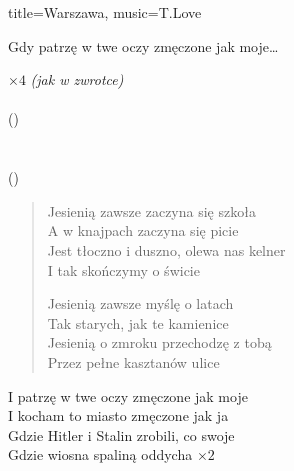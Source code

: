 \begin{song}{title={Warszawa}, music={T.Love}}
\begin{multicols}{2}
\begin{chorus}
          \smallskip

        Gdy patrzę w twe oczy zmęczone jak moje\ldots
    \end{chorus}
    \begin{interlude}
            $\times 4$ \textit{(jak w zwrotce)} \medskip \\
           \\
        ()   \\
           \medskip \\
           \\
        ()   \\
    \end{interlude}
    \begin{verse}
        Jesienią zawsze zaczyna się szkoła \\
        A w knajpach zaczyna się picie \\
        Jest tłoczno i duszno, olewa nas kelner \\
        I tak skończymy o świcie \medskip

        Jesienią zawsze myślę o latach \\
        Tak starych, jak te kamienice \\
        Jesienią o zmroku przechodzę z tobą \\
        Przez pełne kasztanów ulice
    \end{verse}
    \begin{chorus}
        I patrzę w twe oczy zmęczone jak moje \\
        I kocham to miasto zmęczone jak ja \\
        Gdzie Hitler i Stalin zrobili, co swoje \\
        Gdzie wiosna spaliną oddycha $\times 2$
    \end{chorus}
    \begin{outro}
         
    \end{outro}
    \end{multicols}
\end{song}

